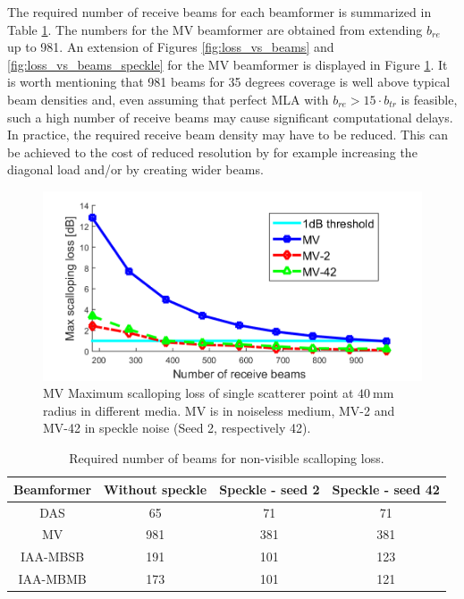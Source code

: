 The required number of receive beams for each beamformer is summarized in Table \ref{table:num_beams}. The numbers for the MV beamformer are obtained from extending $b_{re}$ up to 981. An extension of Figures \ref{fig:loss_vs_beams} and \ref{fig:loss_vs_beams_speckle} for the MV beamformer is displayed in Figure \ref{fig:loss_vs_beams_ext}.
It is worth mentioning that 981 beams for 35 degrees coverage is well above typical beam densities and, even assuming that perfect MLA with $b_{re} > 15 \cdot b_{tr}$ is feasible, such a high number of receive beams may cause significant computational delays.
In practice, the required receive beam density may have to be reduced. This can be achieved to the cost of reduced resolution by for example increasing the diagonal load and/or by creating wider beams.

\begin{figure}[ht]
    \centering
        \includegraphics[width=\linewidth]{./images/results/1/loss_vs_beams_ext.png}
	\caption{MV Maximum scalloping loss of single scatterer point at $40~$mm radius in different media. MV is in noiseless medium, MV-2 and MV-42 in speckle noise (Seed 2, respectively 42).}
	\label{fig:loss_vs_beams_ext}
\end{figure}

\begin{table}[!ht]
\centering
\begin{tabular}{| c | c | c | c |}
  \hline
  Beamformer &   Without speckle   &   Speckle - seed 2 &   Speckle - seed 42 \\
  \hline
  DAS       &   65      &   71  &   71   \\
  MV        &   981     &   381  &   381 \\
  IAA-MBSB  &   191     &   101  &   123  \\
  IAA-MBMB  &   173     &   101 &   121  \\
  \hline
 \end{tabular}
\caption{Required number of beams for non-visible scalloping loss.}
\label{table:num_beams}
\end{table}

